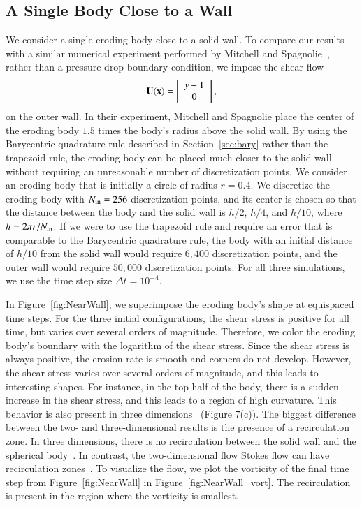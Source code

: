 \documentclass[preprint,10pt]{elsarticle}
\begin{document}
\subsection{A Single Body Close to a Wall}
We consider a single eroding body close to a solid wall.  To compare our
results with a similar numerical experiment performed by Mitchell and
Spagnolie~\cite{mit-spa2017}, rather than a pressure drop boundary
condition, we impose the shear flow
\begin{align}
  {\mathbf{U}}({\mathbf{x}})=\left[
  \begin{array}{c}
    y+1 \\ 0
  \end{array}
  \right],
\end{align}
on the outer wall.  In their experiment, Mitchell and Spagnolie place
the center of the eroding body $1.5$ times the body's radius above the
solid wall.  By using the Barycentric quadrature rule described in
Section~\ref{sec:bary} rather than the trapezoid rule, the eroding body
can be placed much closer to the solid wall without requiring an
unreasonable number of discretization points.  We consider an eroding
body that is initially a circle of radius $r=0.4$.  We discretize the
eroding body with $N_{\mathrm{in}}=256$ discretization points, and its center is
chosen so that the distance between the body and the solid wall is
$h/2$, $h/4$, and $h/10$, where $h = 2\pi r/N_{\mathrm{in}}$.  If we were to use
the trapezoid rule and require an error that is comparable to the
Barycentric quadrature rule, the body with an initial distance of $h/10$
from the solid wall would require $6,400$ discretization points, and the
outer wall would require $50,000$ discretization points.  For all three
simulations, we use the time step size $\Delta t=10^{-4}$.

In Figure~\ref{fig:NearWall}, we superimpose the eroding body's shape at
equispaced time steps.  For the three initial configurations, the shear
stress is positive for all time, but varies over several orders of
magnitude.  Therefore, we color the eroding body's boundary with the
logarithm of the shear stress.  Since the shear stress is always
positive, the erosion rate is smooth and corners do not develop.
However, the shear stress varies over several orders of magnitude, and
this leads to interesting shapes.  For instance, in the top half of the
body, there is a sudden increase in the shear stress, and this leads to
a region of high curvature.  This behavior is also present in three
dimensions~\cite{mit-spa2017} (Figure 7(c)).  The biggest difference
between the two- and three-dimensional results is the presence of a
recirculation zone.  In three dimensions, there is no recirculation
between the solid wall and the spherical body~\cite{cha-feu2003}.  In
contrast, the two-dimensional flow Stokes flow can have recirculation
zones~\cite{chw-wu1975, hig1985}. To visualize the flow, we plot the
vorticity of the final time step from Figure~\ref{fig:NearWall} in
Figure~\ref{fig:NearWall_vort}.  The recirculation is present in the
region where the vorticity is smallest.
\end{document}

